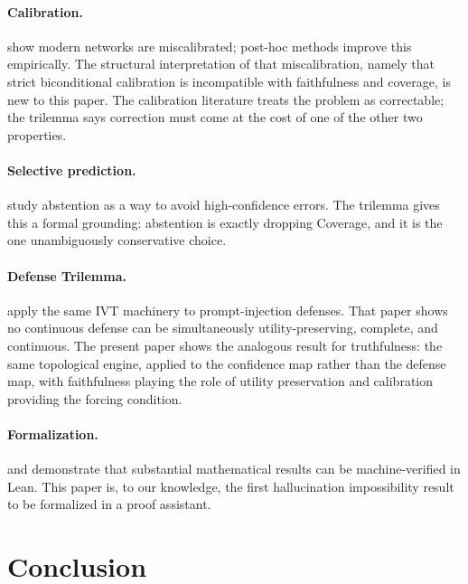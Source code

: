 \documentclass[10pt]{article}
\begin{document}
\paragraph{Calibration.}
\citet{guo2017calibration} show modern networks are miscalibrated;
post-hoc methods \citep{platt1999probabilistic,zadrozny2002obtaining}
improve this empirically. The structural interpretation of that
miscalibration, namely that strict biconditional calibration is incompatible
with faithfulness and coverage, is new to this paper. The calibration
literature treats the problem as correctable; the trilemma says
correction must come at the cost of one of the other two properties.

\paragraph{Selective prediction.}
\citet{kamath2020selective,feng2020language} study abstention as a
way to avoid high-confidence errors. The trilemma gives this a formal
grounding: abstention is exactly dropping Coverage, and it is the one
unambiguously conservative choice.

\paragraph{Defense Trilemma.}
\citet{anonymous2025defense} apply the same IVT machinery to
prompt-injection defenses. That paper shows no continuous defense can be
simultaneously utility-preserving, complete, and continuous. The present
paper shows the analogous result for truthfulness: the same topological
engine, applied to the confidence map rather than the defense map, with
faithfulness playing the role of utility preservation and calibration
providing the forcing condition.

\paragraph{Formalization.}
\citet{avigad2023mathematics} and \citet{buzzard2020formalising}
demonstrate that substantial mathematical results can be machine-verified
in Lean. This paper is, to our knowledge, the first hallucination
impossibility result to be formalized in a proof assistant.

\section{Conclusion}
\label{sec:conclusion}
\end{document}

